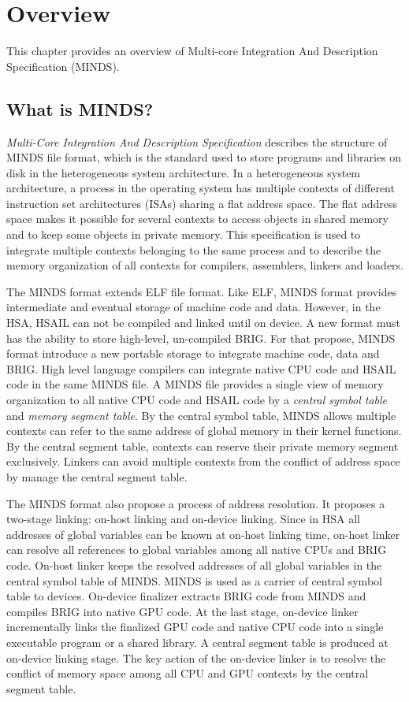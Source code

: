 \section {Overview}
This chapter provides an overview of Multi-core Integration And Description Specification (MINDS).

\subsection{What is MINDS?}
{\em Multi-Core Integration And Description Specification} describes the structure of MINDS file format, which is the standard used to store programs and libraries on disk in the heterogeneous system architecture. In a heterogeneous system architecture, a process in the operating system has multiple contexts of different instruction set architectures (ISAs) sharing a flat address space. The flat address space makes it possible for several contexts to access objects in shared memory and to keep some objects in private memory. This specification is used to integrate multiple contexts belonging to the same process and to describe the memory organization of all contexts for compilers, assemblers, linkers and loaders.

The MINDS format extends ELF file format. Like ELF, MINDS format provides intermediate and eventual storage of machine code and data. However, in the HSA, HSAIL can not be compiled and linked until on device. A new format must has the ability to store high-level, un-compiled BRIG. For that propose, MINDS format introduce a new portable storage to integrate machine code, data and BRIG. High level language compilers can integrate native CPU code and HSAIL code in the same MINDS file. A MINDS file provides a single view of memory organization to all native CPU code and HSAIL code by a {\em central symbol table } and {\em memory segment table}. By the central symbol table, MINDS allows multiple contexts can refer to the same address of global memory in their kernel functions. By the central segment table, contexts can reserve their private memory segment exclusively. Linkers can avoid multiple contexts from the conflict of address space by manage the central segment table.

The MINDS format also propose a process of address resolution. It proposes a two-stage linking: on-host linking and on-device linking. Since in HSA all addresses of global variables can be known at on-host linking time, on-host linker can resolve all references to global variables among all native CPUs and BRIG code. On-host linker keeps the resolved addresses of all global variables in the central symbol table of MINDS. MINDS is used as a carrier of central symbol table to devices. On-device finalizer extracts BRIG code from MINDS and compiles BRIG into native GPU code. At the last stage, on-device linker incrementally links the finalized GPU code and native CPU code into a single executable program or a shared library. A central segment table is produced at on-device linking stage. The key action of the on-device linker is to resolve the conflict of memory space among all CPU and GPU contexts by the central segment table.

